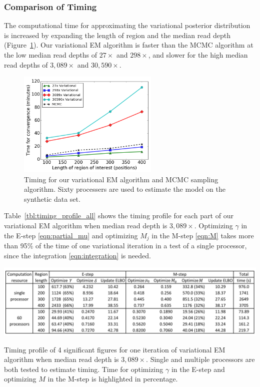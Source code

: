 \documentclass[11pt,reqno]{amsart}
\begin{document}
\subsubsection{Comparison of Timing}
The computational time for approximating the variational posterior distribution is increased by expanding the length of region and the median read depth (Figure~\ref{tbl:timing_mcmc_var}).
Our variational EM algorithm is faster than the MCMC algorithm at the low median read depths of $27\times$ and $298\times$, and slower for the high median read depths of $3,089\times$ and $30,590\times$.
\begin{figure}[ht]
\centering
\includegraphics[width=0.6\textwidth]{figs/timing_var_mcmc.png}
\caption{Timing for our variational EM algorithm and MCMC sampling algorithm.
Sixty processers are used to estimate the model on the synthetic data set.}
\label{tbl:timing_mcmc_var}
\end{figure}
Table~\ref{tbl:timing_profile_all} shows the timing profile for each part of our variational EM algorithm when median read depth is $3,089\times$.
Optimizing $\gamma$ in the E-step \eqref{eqn:partial_mu} and optimizing $M_j$ in the M-step \eqref{eqn:M} takes more than 95\% of the time of one variational iteration in a test of a single processor, since the integration \eqref{eqn:integration} is needed.
\begin{table}[htbp]
\centering
\includegraphics[width=1.0\textwidth]{tables/time_3089X_all_update.png}
\caption{Timing profile of 4 significant figures for one iteration of variational EM algorithm when median read depth is $3,089\times$.
Single and multiple processors are both tested to estimate timing. Time for optimizing $\gamma$ in the E-step and optimizing $M$ in the M-step is highlighted in percentage.}
\label{tbl:timing_profile_all}
\end{table}
\end{document}
